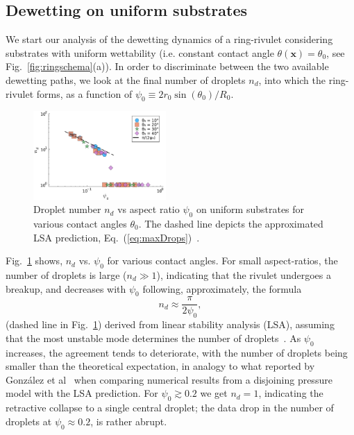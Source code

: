 \documentclass[%
 aip,
 amsmath,amssymb,
 reprint,%
]{revtex4-1}
\begin{document}
\subsection{Dewetting on uniform substrates}\label{subsec:drop-counting}
We start our analysis of the dewetting dynamics of a ring-rivulet considering substrates with uniform wettability (i.e. constant contact angle $\theta(\mathbf{x}) = \theta_0$, see Fig.~\ref{fig:ringschema}(a)). 
In order to discriminate between the two available dewetting paths, we look at the final number of droplets $n_d$, into which the ring-rivulet forms, as a function of $\psi_0 \equiv 2r_0\sin(\theta_0)/R_0$.
\begin{figure}
    \centering
    \includegraphics[width=0.45\textwidth]{Figure_2.pdf}   
    \caption{Droplet number $n_d$ vs aspect ratio $\psi_0$ on uniform substrates for various contact angles $\theta_0$. 
    The dashed line depicts the approximated LSA prediction, Eq.~(\ref{eq:maxDrops})~\cite{gonzalezStabilityLiquidRing2013}.}
    \label{fig:max_drops}
\end{figure}
Fig.~\ref{fig:max_drops} shows, $n_d$ vs. $\psi_0$ for various contact angles. 
For small aspect-ratios, the number of droplets is large ($n_d \gg 1$), indicating that the rivulet undergoes a breakup, and decreases with $\psi_0$ following, approximately, the formula 
\begin{equation}\label{eq:maxDrops}
    n_d \approx \frac{\pi}{2\psi_0},
\end{equation}
(dashed line in Fig.~\ref{fig:max_drops}) derived from linear stability analysis (LSA), assuming that the most unstable mode determines the number of droplets~\cite{gonzalezStabilityLiquidRing2013}.
As $\psi_0$ increases, the agreement tends to deteriorate, with the number of droplets being smaller than the theoretical expectation, in analogy to what reported by Gonz\'alez et al~\cite{gonzalezStabilityLiquidRing2013} when comparing numerical results from a disjoining pressure model with the LSA prediction. 
For $\psi_0 \gtrsim 0.2$ we get $n_d=1$, indicating the retractive collapse to a single central droplet; the data drop in the number of droplets at $\psi_0 \approx 0.2$, is rather abrupt. 
\end{document}
